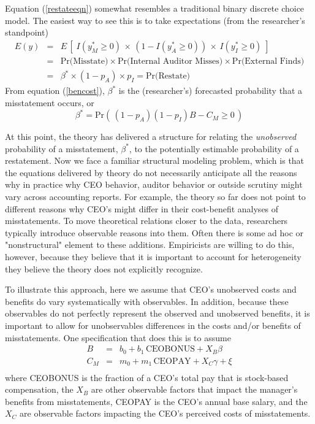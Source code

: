 \documentclass[14pt]{article}
\begin{document}
Equation (\ref{restateeqn}) somewhat resembles a traditional binary discrete choice model. The easiest
way to see this is to take expectations (from the researcher's standpoint)
\begin{equation} \label{equilpr}
\begin{array}{lcl}
 E(y) & = & E\, \left[\; I(y^*_M \ge 0) \, \times\, (1 - I(y^*_A \ge 0)) \, \times\, I(y^*_I \ge 0) \; \right]\\[1em]
 & = &  \mbox{Pr(Misstate)} \times \mbox{Pr(Internal Auditor Misses)} \times
\mbox{Pr(External Finds)}\\[1em]
& = & \beta^* \times (1-p_A) \times p_{I} = \mbox{Pr(Restate)}
\end{array}\end{equation}
From equation (\ref{bencost}), $\beta^*$ is the (researcher's) forecasted probability that a misstatement occurs, or
\begin{equation}\label{betaplus}
\beta^*= \mbox{Pr}\left(\, (1 - p_A)(1 - p_I) B - C_M \ge 0 \,\right)
\end{equation}

At this point, the theory has delivered a structure for relating the {\it unobserved} 
probability of a misstatement, $\beta^*$, to the potentially estimable probability of
a restatement. Now we face a familiar structural modeling problem, which is that 
the equations delivered by theory do not necessarily anticipate all the reasons why
in practice why CEO behavior, auditor behavior or outside scrutiny might vary across 
accounting reports. For example, the theory so far does not point to different 
reasons why CEO's might differ in their cost-benefit analyses of misstatements. 
To move theoretical relations closer to the data, researchers typically introduce observable 
reasons into them. Often there is some ad hoc or "nonstructural" element to these
additions. Empiricists are willing to do this, however, because they believe that 
it is important to account for heterogeneity they believe the theory does not
explicitly recognize.

To illustrate this approach, here we assume that CEO's unobserved costs and benefits
do vary systematically with observables. In addition, because these observables do not
perfectly represent the observed and unobserved benefits, it is important to allow
for unobservables differences in the costs and/or benefits of misstatements. 
One specification that does this is to assume
\begin{equation}\begin{array}{lcl}\label{eqns1}
B & = & b_0 + b_1 \, \mbox{CEOBONUS} + X_B\beta\\[.5em]
C_M & = & m_0 + m_1 \, \mbox{CEOPAY} + X_C\gamma + \xi\\[.5em]
\end{array}
\end{equation}
where CEOBONUS is the fraction of a CEO's total pay that is stock-based compensation, 
the $X_B$ are other observable factors that impact the manager's benefits from misstatements,
CEOPAY is the CEO's annual base salary,  and the $X_C$ are observable factors impacting 
the CEO's perceived costs of misstatements.
\end{document}
